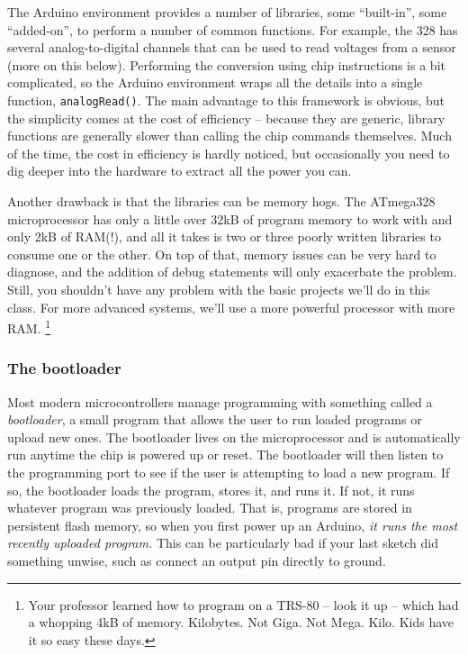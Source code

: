 \documentclass[11pt]{article} %
\begin{document}
The Arduino environment provides a number of libraries, some “built-in”, some “added-on”, to perform a number of common functions. For example, the 328 has several analog-to-digital channels that can be used to read voltages from a sensor (more on this below). Performing the conversion using chip instructions is a bit complicated, so the Arduino environment wraps all the details into a single function, \verb|analogRead()|. The main advantage to this framework is obvious, but the simplicity comes at the cost of efficiency -- because they are generic, library functions are generally slower than calling the chip commands themselves. Much of the time, the cost in efficiency is hardly noticed, but occasionally you need to dig deeper into the hardware to extract all the power you can.

Another drawback is that the libraries can be memory hogs. The ATmega328 microprocessor has only a little over 32kB of program memory to work with and only 2kB of RAM(!), and all it takes is two or three poorly written libraries to consume one or the other. On top of that, memory issues can be very hard to diagnose, and the addition of debug statements will only exacerbate the problem. Still, you shouldn't have any problem with the basic projects we'll do in this class. For more advanced systems, we’ll use a more powerful processor with more RAM. \footnote{Your professor learned how to program on a TRS-80 -- look it up -- which had a whopping 4kB of memory. Kilobytes. Not Giga. Not Mega. Kilo. Kids have it so easy these days.}

\subsubsection*{The bootloader}

Most modern microcontrollers manage programming with something called a \emph{bootloader}, a small program that allows the user to run loaded programs or upload new ones. The bootloader lives on the microprocessor and is automatically run anytime the chip is powered up or reset. The bootloader will then listen to the programming port to see if the user is attempting to load a new program. If so, the bootloader loads the program, stores it, and runs it. If not, it runs whatever program was previously loaded. That is, programs are stored in persistent flash memory, so when you first power up an Arduino, \emph{it runs the most recently uploaded program.} This can be particularly bad if your last sketch did something unwise, such as connect an output pin directly to ground.
\end{document}

